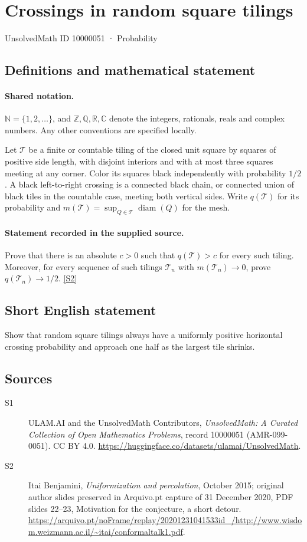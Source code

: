 \documentclass[11pt]{article}
\newcommand{\sref}[2]{\hyperlink{source:#1:#2}{[S#2]}}
\begin{document}
\setcounter{section}{10000050}
\section{Crossings in random square tilings}\label{10000051}
{\small\sffamily UnsolvedMath ID 10000051 · Probability}
\subsection{Definitions and mathematical statement}

\paragraph{Shared notation.}$\mathbb N=\{1,2,\ldots\}$, and $\mathbb Z,\mathbb Q,\mathbb R,\mathbb C$ denote the integers, rationals, reals and complex numbers. Any other conventions are specified locally.


Let $\mathcal T$ be a finite or countable tiling of the closed unit square by squares of positive side length, with disjoint interiors and with at most three squares meeting at any corner. Color its squares black independently with probability $1/2$. A black left-to-right crossing is a connected black chain, or connected union of black tiles in the countable case, meeting both vertical sides. Write $q(\mathcal T)$ for its probability and $m(\mathcal T)=\sup_{Q\in\mathcal T}\operatorname{diam}(Q)$ for the mesh.
\paragraph{Statement recorded in the supplied source.}
Prove that there is an absolute $c>0$ such that $q(\mathcal T)>c$ for every such tiling. Moreover, for every sequence of such tilings $\mathcal T_n$ with $m(\mathcal T_n)\to0$, prove $q(\mathcal T_n)\to1/2$. \sref{10000051}{2}
\subsection{Short English statement}
Show that random square tilings always have a uniformly positive horizontal crossing probability and approach one half as the largest tile shrinks.
\subsection{Sources}
\begin{description}
\item[\hypertarget{source:10000051:1}{S1}] ULAM.AI and the UnsolvedMath Contributors, \emph{UnsolvedMath: A Curated Collection of Open Mathematics Problems}, record 10000051 (AMR-099-0051). CC BY 4.0. \url{https://huggingface.co/datasets/ulamai/UnsolvedMath}.
\item[\hypertarget{source:10000051:2}{S2}] Itai Benjamini, \emph{Uniformization and percolation}, October 2015; original author slides preserved in Arquivo.pt capture of 31 December 2020, PDF slides 22--23, Motivation for the conjecture, a short detour. \url{https://arquivo.pt/noFrame/replay/20201231041533id_/http://www.wisdom.weizmann.ac.il/~itai/conformaltalk1.pdf}.
\end{description}
\label{end:10000051}
\end{document}
